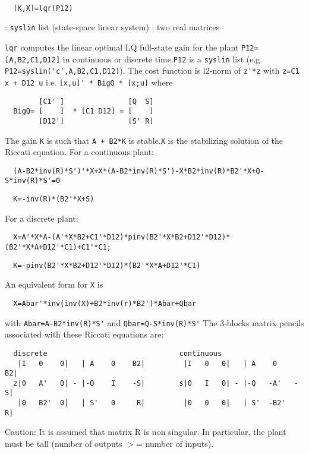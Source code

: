 \begin{mandesc}
   \\ %
\end{mandesc}
\begin{calling_sequence}
\begin{verbatim}
  [K,X]=lqr(P12)  
\end{verbatim}
\end{calling_sequence}
\begin{parameters}
  \begin{varlist}
    : \verb!syslin! list (state-space linear system)
    : two real matrices
  \end{varlist}
\end{parameters}
\begin{mandescription}
  \verb!lqr!  computes the linear optimal LQ full-state gain
  for the plant \verb!P12=[A,B2,C1,D12]! in continuous or
  discrete time.\verb!P12! is a \verb!syslin! list (e.g. \verb!P12=syslin('c',A,B2,C1,D12)!).
  The cost function is l2-norm of \verb!z'*z! with \verb!z=C1 x + D12 u!
  i.e. \verb![x,u]' * BigQ * [x;u]! where
\begin{verbatim}
        [C1' ]               [Q  S]
  BigQ= [    ]  * [C1 D12] = [    ]
        [D12']               [S' R]
\end{verbatim}
The gain \verb!K! is such that \verb!A + B2*K! is stable.\verb!X! is the stabilizing solution of the Riccati equation.
For a continuous plant:
\begin{verbatim}
  (A-B2*inv(R)*S')'*X+X*(A-B2*inv(R)*S')-X*B2*inv(R)*B2'*X+Q-S*inv(R)*S'=0
\end{verbatim}
\begin{verbatim}
  K=-inv(R)*(B2'*X+S)
\end{verbatim}
For a discrete plant:
\begin{verbatim}
  X=A'*X*A-(A'*X*B2+C1'*D12)*pinv(B2'*X*B2+D12'*D12)*(B2'*X*A+D12'*C1)+C1'*C1;
\end{verbatim}
\begin{verbatim}
  K=-pinv(B2'*X*B2+D12'*D12)*(B2'*X*A+D12'*C1)
\end{verbatim}
An equivalent form for \verb!X! is
\begin{verbatim}
  X=Abar'*inv(inv(X)+B2*inv(r)*B2')*Abar+Qbar
\end{verbatim}
with \verb!Abar=A-B2*inv(R)*S'! and \verb!Qbar=Q-S*inv(R)*S'!
The 3-blocks matrix pencils associated with these Riccati equations are:
\begin{verbatim}
  discrete                               continuous
   |I   0    0|   | A    0    B2|         |I   0   0|   | A    0    B2|
  z|0   A'   0| - |-Q    I    -S|        s|0   I   0| - |-Q   -A'   -S|
   |0   B2'  0|   | S'   0     R|         |0   0   0|   | S'  -B2'   R|
\end{verbatim}
Caution: It is assumed that matrix R is non singular. In particular,
the plant must be tall (number of outputs $>$= number of inputs).
\end{mandescription}
